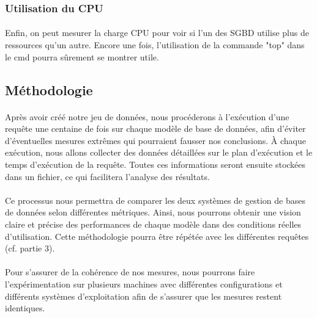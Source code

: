 \documentclass[11pt]{extarticle}
\begin{document}
\subsubsection{Utilisation du CPU}
\paragraph{}
Enfin, on peut mesurer la charge CPU pour voir si l'un des SGBD utilise plus de ressources qu'un autre. Encore une fois, l'utilisation de la commande "top" dans le cmd pourra sûrement se montrer utile.

\subsection{Méthodologie}
\paragraph{}
Après avoir créé notre jeu de données, nous procéderons à l'exécution d'une requête une centaine de fois sur chaque modèle de base de données, afin d'éviter d'éventuelles mesures extrêmes qui pourraient fausser nos conclusions. À chaque exécution, nous allons collecter des données détaillées sur le plan d'exécution et le temps d'exécution de la requête. Toutes ces informations seront ensuite stockées dans un fichier, ce qui facilitera l'analyse des résultats. 
\paragraph{}
Ce processus nous permettra de comparer les deux systèmes de gestion de bases de données selon différentes métriques. Ainsi, nous pourrons obtenir une vision claire et précise des performances de chaque modèle dans des conditions réelles d'utilisation. Cette méthodologie pourra être répétée avec les différentes requêtes (cf. partie 3).
\paragraph{}
Pour s'assurer de la cohérence de nos mesures, nous pourrons faire l'expérimentation sur plusieurs machines avec différentes configurations et différents systèmes d'exploitation afin de s'assurer que les mesures restent identiques.

\vspace{1cm} %

\noindent
{}
\end{document}
